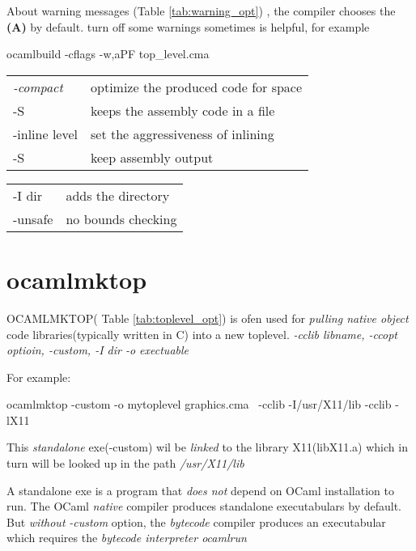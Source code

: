 About warning messages (Table \ref{tab:warning_opt}) , the compiler
chooses the \textbf{(A)} by default.  turn off some warnings sometimes
is helpful, for example

\begin{bashcode}
ocamlbuild -cflags -w,aPF top_level.cma    
\end{bashcode}


\begin{tabular}{|l|l|}
    \hline
    \textit{-compact} & optimize the produced code for space \\
    -S & keeps the assembly code in a file \\
    -inline level & set the aggressiveness of inlining \\
    -S & keep assembly output\\
    \hline
  \end{tabular}


\begin{tabular}{|l|l|}
    \hline
  -I dir & adds the directory \\
  -unsafe & no bounds checking \\
  \hline
\end{tabular}

\section{ocamlmktop}
OCAMLMKTOP( Table \ref{tab:toplevel_opt}) is ofen used for
\textit{pulling native object} code libraries(typically written in C)
into a new toplevel.  \textit{ -cclib libname, -ccopt optioin,
  -custom, -I dir -o exectuable }

For example:

\begin{bashcode}
ocamlmktop -custom -o mytoplevel graphics.cma \
   -cclib -I/usr/X11/lib -cclib -lX11
\end{bashcode}
  
This \textit{standalone} exe(-custom) wil be \textit{linked} to the
library X11(libX11.a) which in turn will be looked up in the path
\textit{/usr/X11/lib}

A standalone exe is a program that \textit{does not } depend on OCaml
installation to run.  The OCaml \textit{native} compiler produces standalone
executabulars by default. But \textit{without} \textit{-custom} option, the
\textit{bytecode} compiler produces an executabular which requires the
\textit{bytecode interpreter ocamlrun}

